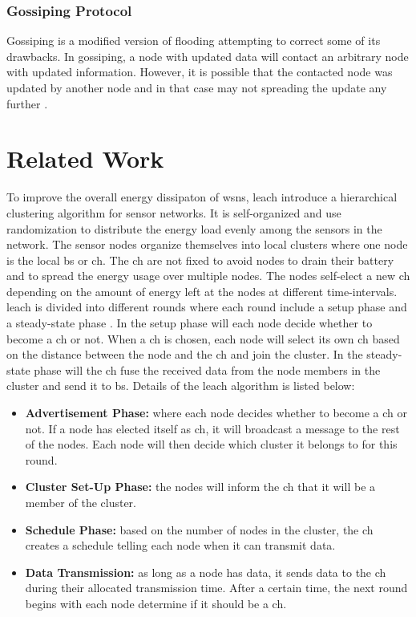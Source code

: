 \documentclass[USenglish]{uit-thesis}
\begin{document}
\subsection{Gossiping Protocol}
Gossiping is a modified version of flooding attempting to correct some of its drawbacks. In gossiping, a node with updated data will contact an arbitrary node with updated information. However, it is possible that the contacted node was updated by another node and in that case may not spreading the update any further \cite{dsbook}.


\chapter{Related Work} \label{chap:related_work}
\glsresetall
To improve the overall energy dissipaton of \gls{wsn}s, \gls{leach} \cite{leach} introduce a hierarchical clustering algorithm for sensor networks. It is self-organized and use randomization to distribute the energy load evenly among the sensors in the network. The sensor nodes organize themselves into local clusters where one node is the local \gls{bs} or \gls{ch}. The \gls{ch} are not fixed to avoid nodes to drain their battery and to spread the energy usage over multiple nodes. The nodes self-elect a new \gls{ch} depending on the amount of energy left at the nodes at different time-intervals. \gls{leach} is divided into different rounds where each round include a setup phase and a steady-state phase \cite{tree_based}. In the setup phase will each node decide whether to become a \gls{ch} or not. When a \gls{ch} is chosen, each node will select its own \gls{ch} based on the distance between the node and the \gls{ch} and join the cluster. In the steady-state phase will the \gls{ch} fuse the received data from the node members in the cluster and send it to \gls{bs}. Details of the \gls{leach} algorithm is listed below:

\begin{itemize}
\item \textbf{Advertisement Phase:} where each node decides whether to become a \gls{ch} or not. If a node has elected itself as \gls{ch}, it will broadcast a message to the rest of the nodes. Each node will then decide which cluster it belongs to for this round.
\item \textbf{Cluster Set-Up Phase:} the nodes will inform the \gls{ch} that it will be a member of the cluster.
\item \textbf{Schedule Phase:} based on the number of nodes in the cluster, the \gls{ch} creates a schedule telling each node when it can transmit data.
\item \textbf{Data Transmission:} as long as a node has data, it sends data to the \gls{ch} during their allocated transmission time. After a certain time, the next round begins with each node determine if it should be a \gls{ch}. 
\end{itemize}
\end{document}
